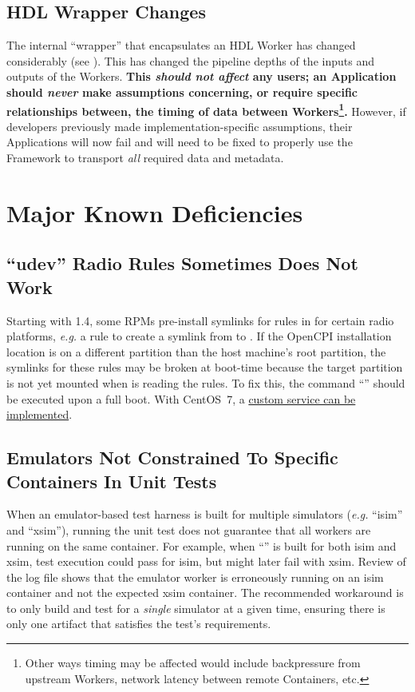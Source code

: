 \subsection{HDL Wrapper Changes} %
\label{sec:15_hdl_wrappers}
The internal ``wrapper'' that encapsulates an HDL Worker has changed considerably (see ).
This has changed the pipeline depths of the inputs and outputs of the Workers.
\textbf{This \textit{should not affect} any users; an Application should \textit{never} make assumptions concerning, or require specific relationships between, the timing of data between Workers\footnote{Other ways timing may be affected would include backpressure from upstream Workers, network latency between remote Containers,  etc.}.}
However, if developers previously made implementation-specific assumptions, their Applications will now fail and will need to be fixed to properly use the Framework to transport \textit{all} required data and metadata.

\section{Major Known Deficiencies}
\label{sec:15_bugs}
\subsection{``udev'' Radio Rules Sometimes Does Not Work} %
\label{bug:5275}
Starting with 1.4, some RPMs pre-install symlinks for rules in  for certain radio platforms, \textit{e.g.} a rule to create a symlink from  to . If the OpenCPI installation location is on a different partition than the host machine's root partition, the symlinks for these rules may be broken at boot-time because the target partition is not yet mounted when  is reading the rules. To fix this, the command ``'' should be executed upon a full boot. With CentOS~7, a \href{https://askubuntu.com/a/679600/139131}{custom  service can be implemented}.

\subsection{Emulators Not Constrained To Specific Containers In Unit Tests} %
\label{bug:5496}
When an emulator-based test harness is built for multiple simulators (\textit{e.g.} ``isim'' and ``xsim''), running the unit test does not guarantee that all workers are running on the same container.
For example, when ``'' is built for both isim and xsim, test execution could pass for isim, but might later fail with xsim.
Review of the log file shows that the emulator worker is erroneously running on an isim container and not the expected xsim container.
The recommended workaround is to only build and test for a \textit{single} simulator at a given time, ensuring there is only one artifact that satisfies the test's requirements.

